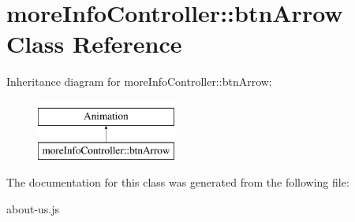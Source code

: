 \hypertarget{classmoreInfoController_1_1btnArrow}{\section{more\-Info\-Controller\-:\-:btn\-Arrow Class Reference}
\label{classmoreInfoController_1_1btnArrow}
}
Inheritance diagram for more\-Info\-Controller\-:\-:btn\-Arrow\-:\begin{figure}[H]
\begin{center}
\leavevmode
\includegraphics[height=2.000000cm]{classmoreInfoController_1_1btnArrow}
\end{center}
\end{figure}


The documentation for this class was generated from the following file\-:\begin{DoxyCompactItemize}
\item 
about-\/us.\-js\end{DoxyCompactItemize}
